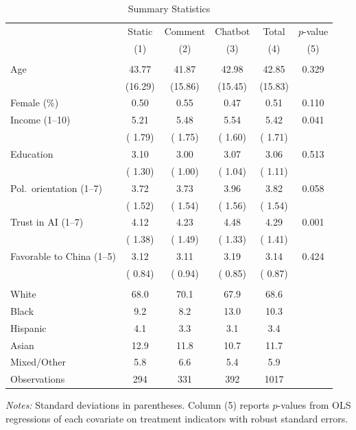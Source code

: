 \begin{table}[htbp]
\centering
\caption{Summary Statistics}
\label{tab:summary}
\small
\begin{tabular}{l*{4}{c}c}
\toprule
 & Static & Comment & Chatbot & Total & $p$-value \\
 & (1) & (2) & (3) & (4) & (5) \\
\midrule
\addlinespace
\multicolumn{6}{l}{\textit{Panel A: Demographics}} \\
\addlinespace
Age & 43.77 & 41.87 & 42.98 & 42.85 & 0.329 \\
    & (16.29) & (15.86) & (15.45) & (15.83) & \\
\addlinespace
Female (\%) &  0.50 &  0.55 &  0.47 &  0.51 & 0.110 \\
\addlinespace
Income (1--10) &  5.21 &  5.48 &  5.54 &  5.42 & 0.041 \\
    & ( 1.79) & ( 1.75) & ( 1.60) & ( 1.71) & \\
\addlinespace
Education &  3.10 &  3.00 &  3.07 &  3.06 & 0.513 \\
    & ( 1.30) & ( 1.00) & ( 1.04) & ( 1.11) & \\
\addlinespace
Pol.\ orientation (1--7) &  3.72 &  3.73 &  3.96 &  3.82 & 0.058 \\
    & ( 1.52) & ( 1.54) & ( 1.56) & ( 1.54) & \\
\addlinespace
Trust in AI (1--7) &  4.12 &  4.23 &  4.48 &  4.29 & 0.001 \\
    & ( 1.38) & ( 1.49) & ( 1.33) & ( 1.41) & \\
\addlinespace
Favorable to China (1--5) &  3.12 &  3.11 &  3.19 &  3.14 & 0.424 \\
    & ( 0.84) & ( 0.94) & ( 0.85) & ( 0.87) & \\
\addlinespace
\multicolumn{6}{l}{\textit{Panel B: Race/Ethnicity (\%)}} \\
\addlinespace
White    & 68.0 & 70.1 & 67.9 & 68.6 & \\
Black    &  9.2 &  8.2 & 13.0 & 10.3 & \\
Hispanic &  4.1 &  3.3 &  3.1 &  3.4 & \\
Asian    & 12.9 & 11.8 & 10.7 & 11.7 & \\
Mixed/Other &  5.8 &  6.6 &  5.4 &  5.9 & \\
\midrule
Observations & 294 & 331 & 392 & 1017 & \\
\bottomrule
\end{tabular}
\par\vspace{4pt}
\begin{minipage}{\textwidth}
\footnotesize \textit{Notes:} Standard deviations in parentheses. Column (5) reports $p$-values from OLS regressions of each covariate on treatment indicators with robust standard errors.
\end{minipage}
\end{table}

